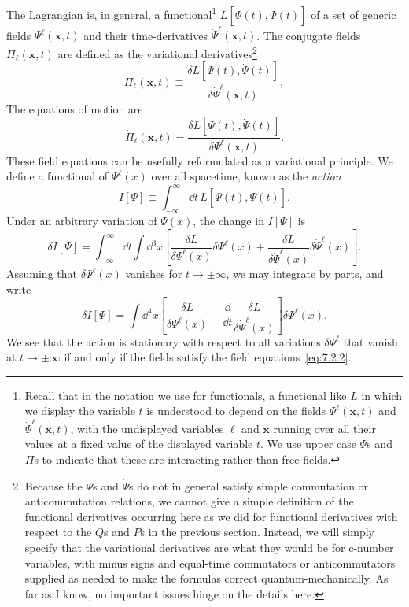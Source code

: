 The Lagrangian is, in general, a functional\footnote{Recall that in the notation
we use for functionals, a functional like $L$ in which we display the variable
$t$ is understood to depend on the fields $\Psi^\ell(\mathbf{x},t)$ and
$\dot\Psi^\ell(\mathbf{x},t)$, with the undisplayed variables $\ell$ and $\mathbf{x}$
running over all their values at a fixed value of the displayed variable $t$.
We use upper case $\Psi$s and $\Pi$s to indicate that these are interacting
rather than free fields.} $L[\Psi(t),\dot\Psi(t)]$ of a set of generic fields
$\Psi^\ell(\mathbf{x},t)$ and their time-derivatives $\dot\Psi^\ell(\mathbf{x},t)$.
The conjugate fields $\Pi_\ell(\mathbf{x},t)$ are defined as the variational
derivatives\footnote{Because the $\Psi$s and $\dot\Psi$s do not in general satisfy
simple commutation or anticommutation relations, we cannot give a simple
definition of the functional derivatives occurring here as we did for functional
derivatives with respect to the $Q$s and $P$s in the previous section. Instead,
we will simply specify that the variational derivatives are what they would be
for c-number variables, with minus signs and equal-time commutators or
anticommutators supplied as needed to make the formulas correct
quantum-mechanically. As far as I know, no important issues hinge on the details
here.}
\begin{equation}
\Pi_\ell(\mathbf{x},t)\equiv
\frac{\delta L[\Psi(t),\dot\Psi(t)]}{\delta\dot\Psi^\ell(\mathbf{x},t)},
\tag{7.2.1}\label{eq:7.2.1}
\end{equation}
The equations of motion are
\begin{equation}
\dot\Pi_\ell(\mathbf{x},t)=
\frac{\delta L[\Psi(t),\dot\Psi(t)]}{\delta\Psi^\ell(\mathbf{x},t)}.
\tag{7.2.2}\label{eq:7.2.2}
\end{equation}
These field equations can be usefully reformulated as a variational principle.
We define a functional of $\Psi^\ell(x)$ over all spacetime, known as the
\textit{action}
\begin{equation}
I[\Psi]\equiv\int_{-\infty}^{\infty}\dd t\,L[\Psi(t),\dot\Psi(t)].
\tag{7.2.3}\label{eq:7.2.3}
\end{equation}
Under an arbitrary variation of $\Psi(x)$, the change in $I[\Psi]$ is
\[
\delta I[\Psi]=\int_{-\infty}^{\infty}\dd t\int \dd^3x
\left[\frac{\delta L}{\delta\Psi^\ell(x)}\delta\Psi^\ell(x)
+\frac{\delta L}{\delta\dot\Psi^\ell(x)}\delta\dot\Psi^\ell(x)\right].
\]
Assuming that $\delta\Psi^\ell(x)$ vanishes for $t\to\pm\infty$, we may integrate
by parts, and write
\begin{equation}
\delta I[\Psi]=\int \dd^4x\left[
\frac{\delta L}{\delta\Psi^\ell(x)}
-\frac{\dd}{\dd t}\frac{\delta L}{\delta\dot\Psi^\ell(x)}
\right]\delta\Psi^\ell(x).
\tag{7.2.4}\label{eq:7.2.4}
\end{equation}
We see that the action is stationary with respect to all variations $\delta\Psi^\ell$
that vanish at $t\to\pm\infty$ if and only if the fields satisfy the field
equations~\eqref{eq:7.2.2}.

